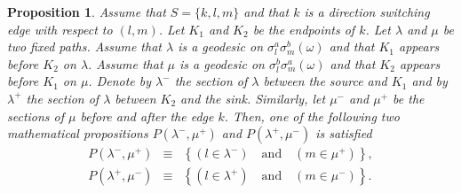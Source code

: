 \documentclass[reqno]{amsart}
\newtheorem{proposition}[theorem]{Proposition}
\begin{document}
\begin{proposition}\label{thm|S3DSwitchConfiguration} Assume that $S=\{k,l,m\}$ and that $k$ is a direction switching edge with respect to $(l,m)$. 
Let $K_1$ and $K_2$ be the endpoints of $k$. Let $\lambda$ and $\mu$ be two fixed paths. Assume that $\lambda$ is a geodesic on $\sigma_l^a\sigma_m^b(\omega)$ and that $K_1$ appears before $K_2$ on $\lambda$. Assume that $\mu$ is a geodesic on $\sigma_l^b\sigma_m^a(\omega)$ and that $K_2$ appears before $K_1$ on $\mu$. Denote by $\lambda^-$ the section of $\lambda$ between the source and $K_1$ and by $\lambda^+$ the section of $\lambda$ between $K_2$ and the sink. Similarly, let $\mu^-$ and $\mu^+$ be the sections of $\mu$ before and after the edge $k$.  
Then, one of the following two mathematical propositions $P(\lambda^-,\mu^+)$ and $P(\lambda^+,\mu^-)$ is satisfied
\begin{eqnarray}
P(\lambda^-,\mu^+)&\equiv&\left\{ (l\in \lambda^-) \quad\mbox{and}\quad (m\in\mu^+)\right\},\label{eqn|defLmMp}\\
P(\lambda^+,\mu^-)&\equiv&\left\{ (l\in \lambda^+) \quad\mbox{and}\quad (m\in\mu^-)\right\}.\label{eqn|defLpMm}
\end{eqnarray}
\end{proposition}
\end{document}
